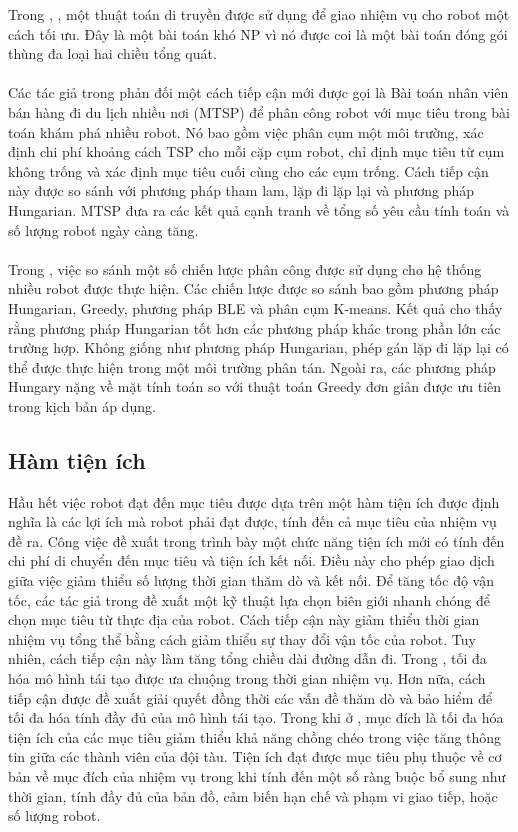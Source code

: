 \documentclass[11pt,openany]{book}
\begin{document}
Trong \cite{zhao1996genetic}, \cite{leigh2007using}, một thuật toán di truyền được sử dụng để giao nhiệm vụ cho robot một cách tối ưu. Đây là một bài toán khó NP vì nó được coi là một bài toán đóng gói thùng đa loại hai chiều tổng quát.\\\\
Các tác giả trong \cite{faigl2012goal} phản đối một cách tiếp cận mới được gọi là Bài toán nhân viên bán hàng đi du lịch nhiều nơi (MTSP) để phân công robot với mục tiêu trong bài toán khám phá nhiều robot. Nó bao gồm việc phân cụm một môi trường, xác định chi phí khoảng cách TSP cho mỗi cặp cụm robot, chỉ định mục tiêu từ cụm không trống và xác định mục tiêu cuối cùng cho các cụm trống. Cách tiếp cận này được so sánh với phương pháp tham lam, lặp đi lặp lại và phương pháp Hungarian. MTSP đưa ra các kết quả cạnh tranh về tổng số yêu cầu tính toán và số lượng robot ngày càng tăng.\\\\
Trong \cite{kulich2015comparison}, việc so sánh một số chiến lược phân công được sử dụng cho hệ thống nhiều robot được thực hiện. Các chiến lược được so sánh bao gồm phương pháp Hungarian, Greedy, phương pháp BLE và phân cụm K-means. Kết quả cho thấy rằng phương pháp Hungarian tốt hơn các phương pháp khác trong phần lớn các trường hợp. Không giống như phương pháp Hungarian, phép gán lặp đi lặp lại có thể được thực hiện trong một môi trường phân tán. Ngoài ra, các phương pháp Hungary nặng về mặt tính toán so với thuật toán Greedy đơn giản được ưu tiên trong kịch bản áp dụng.
\subsection{Hàm tiện ích}
Hầu hết việc robot đạt đến mục tiêu được dựa trên một hàm tiện ích được định nghĩa là các lợi ích mà robot phải đạt được, tính đến cả mục tiêu của nhiệm vụ đề ra\cite{burgard2000collaborative}. Công việc đề xuất trong \cite{benavides2016multi} trình bày một chức năng tiện ích mới có tính đến chi phí di chuyển đến mục tiêu và tiện ích kết nối. Điều này cho phép giao dịch giữa việc giảm thiểu số lượng thời gian thăm dò và kết nối. Để tăng tốc độ vận tốc, các tác giả trong \cite{cieslewski2017rapid} đề xuất một kỹ thuật lựa chọn biên giới nhanh chóng để chọn mục tiêu từ thực địa của robot. Cách tiếp cận này giảm thiểu thời gian nhiệm vụ tổng thể bằng cách giảm thiểu sự thay đổi vận tốc của robot. Tuy nhiên, cách tiếp cận này làm tăng tổng chiều dài đường dẫn đi. Trong \cite{heng2015efficient}, tối đa hóa mô hình tái tạo được ưa chuộng trong thời gian nhiệm vụ. Hơn nữa, cách tiếp cận được đề xuất giải quyết đồng thời các vấn đề thăm dò và bảo hiểm để tối đa hóa tính đầy đủ của mô hình tái tạo. Trong khi ở \cite{simmons2000coordination}, mục đích là tối đa hóa tiện ích của các mục tiêu giảm thiểu khả năng chồng chéo trong việc tăng thông tin giữa các thành viên của đội tàu. Tiện ích đạt được mục tiêu phụ thuộc về cơ bản về mục đích của nhiệm vụ trong khi tính đến một số ràng buộc bổ sung như thời gian, tính đầy đủ của bản đồ, cảm biến hạn chế và phạm vi giao tiếp, hoặc số lượng robot.
\end{document}
